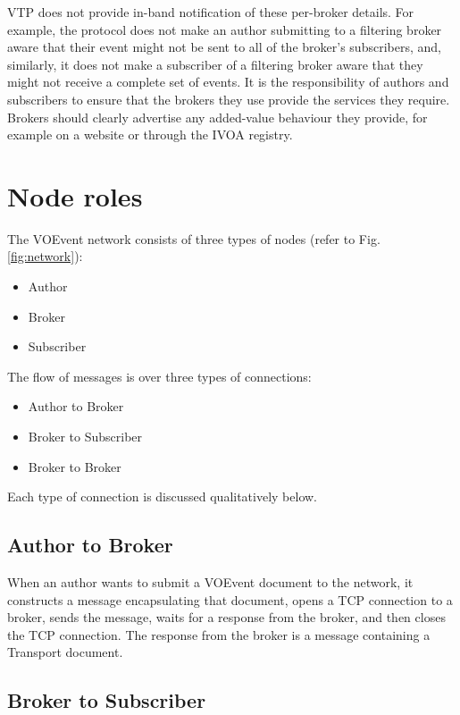 \documentclass[a4paper,11pt]{ivoa}
\begin{document}
VTP does not provide in-band notification of these per-broker details. For
example, the protocol does not make an author submitting to a filtering broker
aware that their event might not be sent to all of the broker's subscribers,
and, similarly, it does not make a subscriber of a filtering broker aware that
they might not receive a complete set of events. It is the responsibility of
authors and subscribers to ensure that the brokers they use provide the
services they require. Brokers should clearly advertise any added-value
behaviour they provide, for example on a website or through the IVOA registry.

\section{Node roles}
\label{sec:noderoles}

The VOEvent network consists of three types of nodes (refer to Fig.
\ref{fig:network}):

\begin{itemize}
    \item{Author}
    \item{Broker}
    \item{Subscriber}
\end{itemize}

The flow of messages is over three types of connections:

\begin{itemize}
    \item{Author to Broker}
    \item{Broker to Subscriber}
    \item{Broker to Broker}
\end{itemize}

Each type of connection is discussed qualitatively below.

\subsection{Author to Broker}

When an author wants to submit a VOEvent document to the network, it
constructs a message encapsulating that document, opens a TCP connection to a
broker, sends the message, waits for a response from the broker, and then
closes the TCP connection. The response from the broker is a message
containing a Transport document.

\subsection{Broker to Subscriber}
\end{document}
